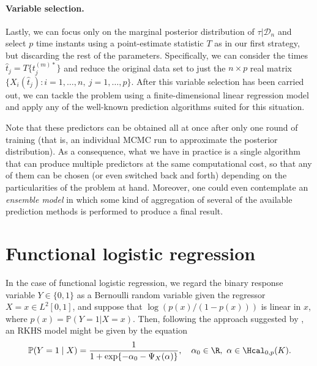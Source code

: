   \paragraph{Variable selection.} Lastly, we can focus only on the marginal posterior distribution of \(\tau|\mathcal D_n\) and select \(p\) time instants using a point-estimate statistic \(T\) as in our first strategy, but discarding the rest of the parameters. Specifically, we can consider the times \(\hat t_j = T\{t_j^{(m)*}\}\) and reduce the original data set to just the \(n\times p\) real matrix \(\{X_i(\hat t_j): i=1, \dots,n, \ j=1,\dots,p\}\). After this variable selection has been carried out, we can tackle the problem using a finite-dimensional linear regression model and apply any of the well-known prediction algorithms suited for this situation.

Note that these predictors can be obtained all at once after only one round of training (that is, an individual MCMC run to approximate the posterior distribution). As a consequence, what we have in practice is a single algorithm that can produce multiple predictors at the same computational cost, so that any of them can be chosen (or even switched back and forth) depending on the particularities of the problem at hand. Moreover, one could even contemplate an \textit{ensemble model} in which some kind of aggregation of several of the available prediction methods is performed to produce a final result.

\section{Functional logistic regression}\label{sec:rkhs-logistic-model}

In the case of functional logistic regression, we regard the binary response variable \(Y\in\{0, 1\}\) as a Bernoulli random variable given the regressor \(X=x \in L^2[0, 1]\), and suppose that \(\log\left(p(x)/(1-p(x))\right)\) is linear in \(x\), where \(p(x)=\mathbb P(Y=1| X=x)\). Then, following the approach  suggested by \citet{berrendero2018functional}, an RKHS model might be given  by the  equation
\begin{equation}\label{eq:rkhs-model-logistic}
  \mathbb P(Y=1 \mid X) = \frac{1}{1 + \exp\{-\alpha_0 - \Psi_X(\alpha)\}}, \quad \alpha_0 \in \R, \ \alpha \in \Hcal_{0,p}(K).
\end{equation}

